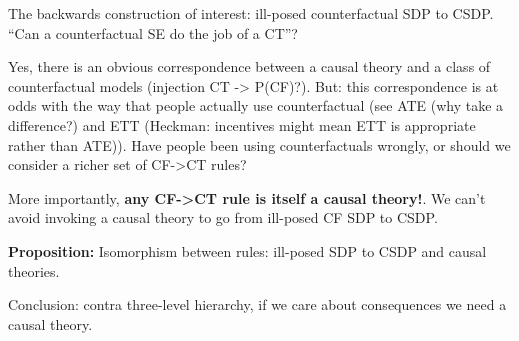 The backwards construction of interest: ill-posed counterfactual SDP to CSDP. ``Can a counterfactual SE do the job of a CT''?

Yes, there is an obvious correspondence between a causal theory and a class of counterfactual models (injection CT -> P(CF)?). But: this correspondence is at odds with the way that people actually use counterfactual (see ATE (why take a difference?) and ETT (Heckman: incentives might mean ETT is appropriate rather than ATE)). Have people been using counterfactuals wrongly, or should we consider a richer set of CF->CT rules?

More importantly, \textbf{any CF->CT rule is itself a causal theory!}. We can't avoid invoking a causal theory to go from ill-posed CF SDP to CSDP.

\textbf{Proposition:} Isomorphism between rules: ill-posed SDP to CSDP and causal theories.

Conclusion: contra three-level hierarchy, if we care about consequences we need a causal theory.